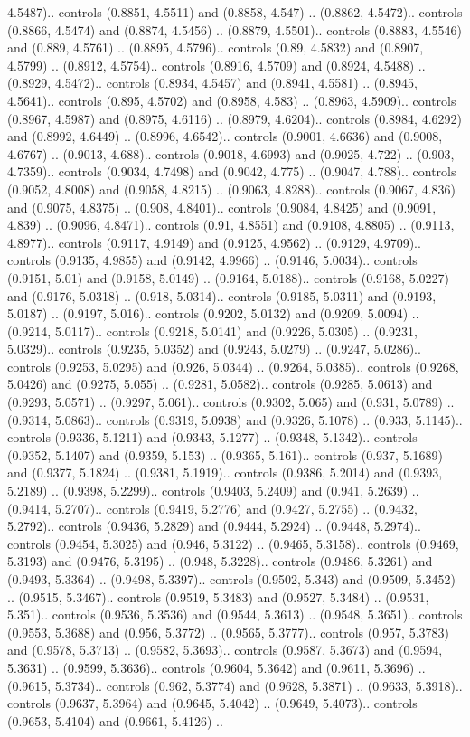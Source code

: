 4.5487).. controls (0.8851, 4.5511) and (0.8858, 4.547) .. (0.8862, 4.5472).. controls (0.8866, 4.5474) and (0.8874, 4.5456) .. (0.8879, 4.5501).. controls (0.8883, 4.5546) and (0.889, 4.5761) .. (0.8895, 4.5796).. controls (0.89, 4.5832) and (0.8907, 4.5799) .. (0.8912, 4.5754).. controls (0.8916, 4.5709) and (0.8924, 4.5488) .. (0.8929, 4.5472).. controls (0.8934, 4.5457) and (0.8941, 4.5581) .. (0.8945, 4.5641).. controls (0.895, 4.5702) and (0.8958, 4.583) .. (0.8963, 4.5909).. controls (0.8967, 4.5987) and (0.8975, 4.6116) .. (0.8979, 4.6204).. controls (0.8984, 4.6292) and (0.8992, 4.6449) .. (0.8996, 4.6542).. controls (0.9001, 4.6636) and (0.9008, 4.6767) .. (0.9013, 4.688).. controls (0.9018, 4.6993) and (0.9025, 4.722) .. (0.903, 4.7359).. controls (0.9034, 4.7498) and (0.9042, 4.775) .. (0.9047, 4.788).. controls (0.9052, 4.8008) and (0.9058, 4.8215) .. (0.9063, 4.8288).. controls (0.9067, 4.836) and (0.9075, 4.8375) .. (0.908, 4.8401).. controls (0.9084, 4.8425) and (0.9091, 4.839) .. (0.9096, 4.8471).. controls (0.91, 4.8551) and (0.9108, 4.8805) .. (0.9113, 4.8977).. controls (0.9117, 4.9149) and (0.9125, 4.9562) .. (0.9129, 4.9709).. controls (0.9135, 4.9855) and (0.9142, 4.9966) .. (0.9146, 5.0034).. controls (0.9151, 5.01) and (0.9158, 5.0149) .. (0.9164, 5.0188).. controls (0.9168, 5.0227) and (0.9176, 5.0318) .. (0.918, 5.0314).. controls (0.9185, 5.0311) and (0.9193, 5.0187) .. (0.9197, 5.016).. controls (0.9202, 5.0132) and (0.9209, 5.0094) .. (0.9214, 5.0117).. controls (0.9218, 5.0141) and (0.9226, 5.0305) .. (0.9231, 5.0329).. controls (0.9235, 5.0352) and (0.9243, 5.0279) .. (0.9247, 5.0286).. controls (0.9253, 5.0295) and (0.926, 5.0344) .. (0.9264, 5.0385).. controls (0.9268, 5.0426) and (0.9275, 5.055) .. (0.9281, 5.0582).. controls (0.9285, 5.0613) and (0.9293, 5.0571) .. (0.9297, 5.061).. controls (0.9302, 5.065) and (0.931, 5.0789) .. (0.9314, 5.0863).. controls (0.9319, 5.0938) and (0.9326, 5.1078) .. (0.933, 5.1145).. controls (0.9336, 5.1211) and (0.9343, 5.1277) .. (0.9348, 5.1342).. controls (0.9352, 5.1407) and (0.9359, 5.153) .. (0.9365, 5.161).. controls (0.937, 5.1689) and (0.9377, 5.1824) .. (0.9381, 5.1919).. controls (0.9386, 5.2014) and (0.9393, 5.2189) .. (0.9398, 5.2299).. controls (0.9403, 5.2409) and (0.941, 5.2639) .. (0.9414, 5.2707).. controls (0.9419, 5.2776) and (0.9427, 5.2755) .. (0.9432, 5.2792).. controls (0.9436, 5.2829) and (0.9444, 5.2924) .. (0.9448, 5.2974).. controls (0.9454, 5.3025) and (0.946, 5.3122) .. (0.9465, 5.3158).. controls (0.9469, 5.3193) and (0.9476, 5.3195) .. (0.948, 5.3228).. controls (0.9486, 5.3261) and (0.9493, 5.3364) .. (0.9498, 5.3397).. controls (0.9502, 5.343) and (0.9509, 5.3452) .. (0.9515, 5.3467).. controls (0.9519, 5.3483) and (0.9527, 5.3484) .. (0.9531, 5.351).. controls (0.9536, 5.3536) and (0.9544, 5.3613) .. (0.9548, 5.3651).. controls (0.9553, 5.3688) and (0.956, 5.3772) .. (0.9565, 5.3777).. controls (0.957, 5.3783) and (0.9578, 5.3713) .. (0.9582, 5.3693).. controls (0.9587, 5.3673) and (0.9594, 5.3631) .. (0.9599, 5.3636).. controls (0.9604, 5.3642) and (0.9611, 5.3696) .. (0.9615, 5.3734).. controls (0.962, 5.3774) and (0.9628, 5.3871) .. (0.9633, 5.3918).. controls (0.9637, 5.3964) and (0.9645, 5.4042) .. (0.9649, 5.4073).. controls (0.9653, 5.4104) and (0.9661, 5.4126) .. 
